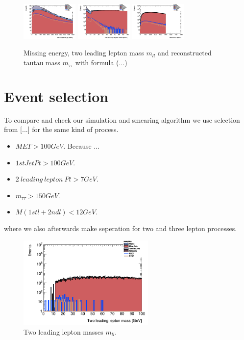 \documentclass[tightenline,notitlepage,nofootinbib]{revtex4-1}
\begin{document}
\begin{figure}[!ht]
  \centering
  \includegraphics[width=0.25\textwidth]{h_MET.png}
  \includegraphics[width=0.25\textwidth]{h_llmass.png}
  \includegraphics[width=0.25\textwidth]{h_Mtautau2.png}
  \caption{Missing energy, two leading lepton mass $m_{ll}$ and reconstructed tautau mass $m_{\tau\tau}$ with formula (...)}
\end{figure}

\section{Event selection}

To compare and check our simulation and smearing algorithm we use selection from [...] for the same kind of process.  
\begin{itemize}
\item $MET>100 GeV$. Because ...
\item $1stJet Pt>100GeV$. 
\item $2~ leading ~ lepton ~ Pt > 7 GeV$.
\item $m_{\tau \tau}>150 GeV$.
\item $M(1st l + 2nd l)<12 GeV$.
\end{itemize}
where we also afterwards make seperation for two and three lepton processes. 

\begin{figure}
  \includegraphics[width=0.6\textwidth]{h_llmass_cuts.png}
  \caption{Two leading lepton masses $m_{ll}$.}
\end{figure}
\end{document}
